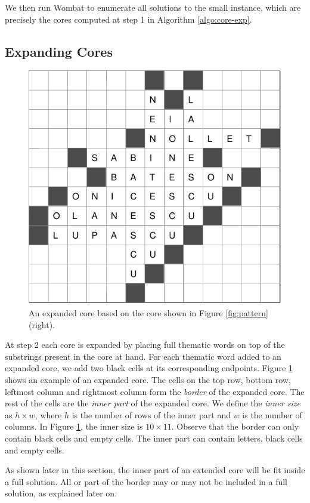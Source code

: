 We then run {\sc Wombat} to enumerate all solutions to the small instance, which are precisely the 
cores computed at step 1 in Algorithm \ref{algo:core-exp}.



\subsection{Expanding Cores}

\begin{figure}
\centering
\includegraphics[width=.45\textwidth]{_plots/extcore-alive-0-puzzle-72-2975-1488--1--1.pdf}
\caption{An expanded core based on the core shown in Figure \ref{fig:pattern} (right).}
\label{fig:exp-core}
\end{figure}


At step 2 each core is expanded by placing full thematic words on top of the substrings present in the core at hand.
For each thematic word added to an expanded core, we add two black cells at its corresponding endpoints.
Figure \ref{fig:exp-core} shows an example of an expanded core. 
The cells on the top row, bottom row, leftmost column and rightmost column form the \emph{border} of the expanded core. The rest of the cells are the \emph{inner part} of the expanded core.
We define the \emph{inner size} as $h \times w$, where $h$ is the number of rows
of the inner part and $w$ is the number of columns.
In Figure \ref{fig:exp-core}, the inner size is $10 \times 11$.
Observe that the border can only contain black cells and empty cells.
The inner part can contain letters, black cells and empty cells.

As shown later in this section, the inner part of an extended core will be fit inside a full solution.
All or part of the border may or may not be included in a full solution, as explained later on.

